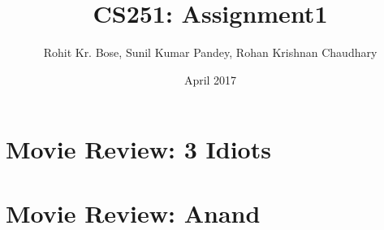 \documentclass{article}
\title{CS251: Assignment1}
\author{Rohit Kr. Bose, Sunil Kumar Pandey, Rohan Krishnan Chaudhary }
\date{April 2017}
\begin{document}
\maketitle

\section{Movie Review: 3 Idiots}

\section{Movie Review: Anand}
\end{document}
